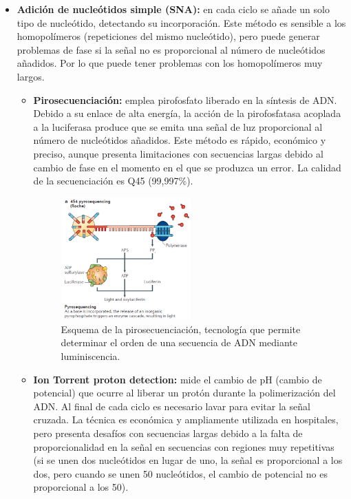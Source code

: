 \begin{itemize}
\begin{itemize}
\item \textbf{Adición de nucleótidos simple (SNA):} en cada ciclo se añade un solo tipo de nucleótido, detectando su incorporación. Este método es sensible a los homopolímeros (repeticiones del mismo nucleótido), pero puede generar problemas de fase si la señal no es proporcional al número de nucleótidos añadidos. Por lo que puede tener problemas con los homopolímeros muy largos.
\begin{itemize}
\item \textbf{Pirosecuenciación:} emplea pirofosfato liberado en la síntesis de ADN. Debido a su enlace de alta energía, la acción de la pirofosfatasa acoplada a la luciferasa produce que se emita una señal de luz proporcional al número de nucleótidos añadidos. Este método es rápido, económico y preciso, aunque presenta limitaciones con secuencias largas debido al cambio de fase en el momento en el que se produzca un error. La calidad de la secuenciación es Q45 (99,997\%). 

\begin{figure}[htbp]
\centering
\includegraphics[width = 0.5\textwidth]{figs/pirosecuenciacion.png}
\caption{Esquema de la pirosecuenciación, tecnología que permite determinar el orden de una secuencia de ADN mediante luminiscencia.}
\end{figure}

\item \textbf{Ion Torrent proton detection:} mide el cambio de pH (cambio de potencial) que ocurre al liberar un protón durante la polimerización del ADN. Al final de cada ciclo es necesario lavar para evitar la señal cruzada. La técnica es económica y ampliamente utilizada en hospitales, pero presenta desafíos con secuencias largas debido a la falta de proporcionalidad en la señal en secuencias con regiones muy repetitivas (si se unen dos nucleótidos en lugar de uno, la señal es proporcional a los dos, pero cuando se unen 50 nucleótidos, el cambio de potencial no es proporcional a los 50).


\end{itemize}
\end{itemize}
\end{itemize}
